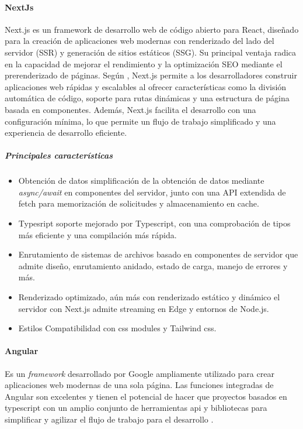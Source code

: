 \paragraph{NextJs}
Next.js es un framework de desarrollo web de código abierto para React, diseñado para la creación de aplicaciones web modernas con renderizado del lado del servidor (SSR) y generación de sitios estáticos (SSG). Su principal ventaja radica en la capacidad de mejorar el rendimiento y la optimización SEO mediante el prerenderizado de páginas. Según \cite{Vercel2020}, Next.js permite a los desarrolladores construir aplicaciones web rápidas y escalables al ofrecer características como la división automática de código, soporte para rutas dinámicas y una estructura de página basada en componentes. Además, Next.js facilita el desarrollo con una configuración mínima, lo que permite un flujo de trabajo simplificado y una experiencia de desarrollo eficiente.
\subparagraph{Principales características}
\begin{itemize}
    \item Obtención de datos simplificación de la obtención de datos mediante \textit{async/await} en componentes del servidor, junto con una API extendida de fetch para memorización de solicitudes y almacenamiento en cache.
    \item Typesript soporte mejorado por Typescript, con una comprobación de tipos más eficiente y una compilación más rápida.
    \item Enrutamiento de sistemas de archivos basado en componentes de servidor que admite diseño, enrutamiento anidado, estado de carga, manejo de errores y más.
    \item Renderizado optimizado, aún más con renderizado estático y dinámico el servidor con Next.js admite streaming en Edge y entornos de Node.js.
    \item Estilos Compatibilidad con \acrfull{css} modules y Tailwind \acrshort{css}.
\end{itemize}

\paragraph{Angular}
Es un \textit{framework} desarrollado por Google ampliamente utilizado para crear aplicaciones web modernas de una sola página. Las funciones integradas de Angular son excelentes y tienen el potencial de hacer que proyectos basados en typescript con un amplio conjunto de herramientas \acrfull{api} y bibliotecas para simplificar y agilizar el flujo de trabajo para el desarrollo \citep{angular}.

